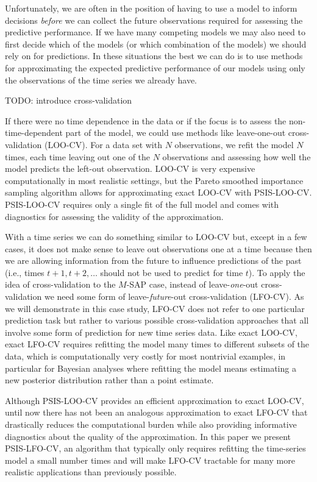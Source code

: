 \documentclass[american,]{article}
\begin{document}
Unfortunately, we are often in the position of having to use a model to
inform decisions \emph{before} we can collect the future observations
required for assessing the predictive performance. If we have many
competing models we may also need to first decide which of the models
(or which combination of the models) we should rely on for predictions.
In these situations the best we can do is to use methods for
approximating the expected predictive performance of our models using
only the observations of the time series we already have.

TODO: introduce cross-validation

If there were no time dependence in the data or if the focus is to
assess the non-time-dependent part of the model, we could use methods
like leave-one-out cross-validation (LOO-CV). For a data set with \(N\)
observations, we refit the model \(N\) times, each time leaving out one
of the \(N\) observations and assessing how well the model predicts the
left-out observation. LOO-CV is very expensive computationally in most
realistic settings, but the Pareto smoothed importance sampling
\citep[PSIS;][]{vehtari2017loo, vehtari2017psis} algorithm allows for
approximating exact LOO-CV with PSIS-LOO-CV. PSIS-LOO-CV requires only a
single fit of the full model and comes with diagnostics for assessing
the validity of the approximation.

With a time series we can do something similar to LOO-CV but, except in
a few cases, it does not make sense to leave out observations one at a
time because then we are allowing information from the future to
influence predictions of the past (i.e., times \(t + 1, t+2, \ldots\)
should not be used to predict for time \(t\)). To apply the idea of
cross-validation to the \(M\)-SAP case, instead of leave-\emph{one}-out
cross-validation we need some form of leave-\emph{future}-out
cross-validation (LFO-CV). As we will demonstrate in this case study,
LFO-CV does not refer to one particular prediction task but rather to
various possible cross-validation approaches that all involve some form
of prediction for new time series data. Like exact LOO-CV, exact LFO-CV
requires refitting the model many times to different subsets of the
data, which is computationally very costly for most nontrivial examples,
in particular for Bayesian analyses where refitting the model means
estimating a new posterior distribution rather than a point estimate.

Although PSIS-LOO-CV provides an efficient approximation to exact
LOO-CV, until now there has not been an analogous approximation to exact
LFO-CV that drastically reduces the computational burden while also
providing informative diagnostics about the quality of the
approximation. In this paper we present PSIS-LFO-CV, an algorithm that
typically only requires refitting the time-series model a small number
times and will make LFO-CV tractable for many more realistic
applications than previously possible.
\end{document}
